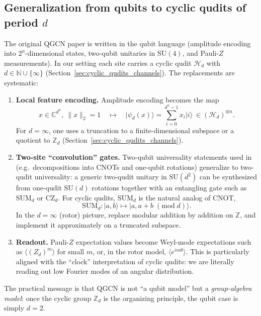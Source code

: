 \documentclass[11pt,oneside]{amsbook}
\numberwithin{equation}{section}
\theoremstyle{plain}
\theoremstyle{definition}
\theoremstyle{remark}
\newcommand{\ket}[1]{\lvert #1 \rangle}
\begin{document}
\subsection{Generalization from qubits to cyclic qudits of period \texorpdfstring{$d$}{d}}
\label{subsec:qgcn_qudit_generalization}

The original QGCN paper \cite{Zheng2021QGCN} is written in the qubit language (amplitude encoding into $2^n$-dimensional states,
two-qubit unitaries in $\mathrm{SU}(4)$, and Pauli-$Z$ measurements).
In our setting each site carries a cyclic qudit $\mathcal{H}_d$ with $d\in\mathbb{N}\cup\{\infty\}$
(Section~\ref{sec:cyclic_qudits_channels}).  The replacements are systematic:

\begin{enumerate}
\item \textbf{Local feature encoding.}
Amplitude encoding becomes the map
\[
  x\in\mathbb{C}^{d^n},\ \|x\|_2=1
  \quad\longmapsto\quad
  \ket{\psi_d(x)}=\sum_{i=0}^{d^n-1} x_i\ket{i}\ \in (\mathcal{H}_d)^{\otimes n}.
\]
For $d=\infty$, one uses a truncation to a finite-dimensional subspace or a quotient to $\mathbb{Z}_d$
(Section~\ref{sec:cyclic_qudits_channels}).

\item \textbf{Two-site ``convolution'' gates.}
Two-qubit universality statements used in \cite{Zheng2021QGCN} (e.g.\ decompositions into CNOTs and one-qubit rotations)
generalize to two-qudit universality: a generic two-qudit unitary in $\mathrm{SU}(d^2)$ can be synthesized from
one-qudit $\mathrm{SU}(d)$ rotations together with an entangling gate such as $\mathrm{SUM}_d$ or $\mathrm{CZ}_d$.
For cyclic qudits, $\mathrm{SUM}_d$ is the natural analog of CNOT,
\[
  \mathrm{SUM}_d:\ket{a,b}\mapsto \ket{a,a+b\;(\mathrm{mod}\;d)}.
\]
In the $d=\infty$ (rotor) picture, replace modular addition by addition on $\mathbb{Z}$, and implement it approximately
on a truncated subspace.

\item \textbf{Readout.}
Pauli-$Z$ expectation values become Weyl-mode expectations such as $\langle (Z_d)^m\rangle$ for small $m$,
or, in the rotor model, $\langle e^{im\theta}\rangle$.
This is particularly aligned with the ``clock'' interpretation of cyclic qudits:
we are literally reading out low Fourier modes of an angular distribution.
\end{enumerate}

The practical message is that QGCN is not ``a qubit model'' but a \emph{group-algebra model}:
once the cyclic group $\mathbb{Z}_d$ is the organizing principle, the qubit case is simply $d=2$.
\end{document}
